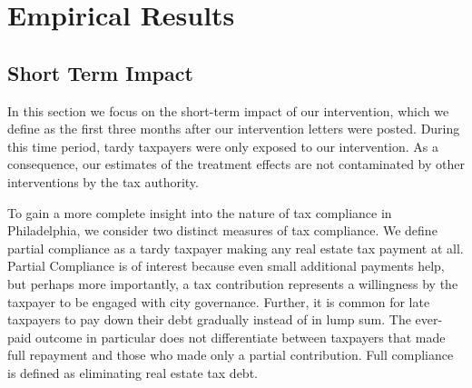 \documentclass[12pt]{article}
\begin{document}
\section{Empirical Results}

\subsection{Short Term Impact}

In this section we focus on the short-term impact of our intervention,
which we define as the first three months after our intervention
letters were posted. During this time period, tardy taxpayers were
only exposed to our intervention. As a consequence, our estimates of
the treatment effects are not contaminated by other interventions by
the tax authority.

To gain a more complete insight into the nature of tax compliance in
Philadelphia, we consider two distinct measures of tax compliance. We
define partial compliance as a tardy taxpayer making any real estate
tax payment at all.  Partial Compliance is of interest because even
small additional payments help, but perhaps more importantly, a tax
contribution represents a willingness by the taxpayer to be engaged
with city governance.  Further, it is common for late taxpayers to pay
down their debt gradually instead of in lump sum. The ever-paid
outcome in particular does not differentiate between taxpayers that
made full repayment and those who made only a partial contribution.
Full compliance is defined as eliminating real estate tax debt.
\end{document}
